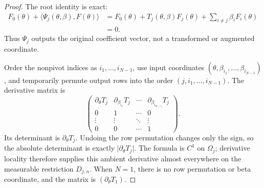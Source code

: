 \begin{proof}
The root identity is exact:
\begin{equation}
\label{eq:appendix-display-078}
\begin{aligned}
F_0(\theta)+\langle\Psi_j(\theta,\beta),F(\theta)\rangle
&=F_0(\theta)+T_j(\theta,\beta)F_j(\theta)
+\sum_{i\neq j}\beta_iF_i(\theta)\\
&=0.
\end{aligned}
\end{equation}
Thus \(\Psi_j\) outputs the original coefficient vector, not a transformed or augmented coordinate.

Order the nonpivot indices as \(i_1,\ldots,i_{N-1}\), use input coordinates
\((\theta,\beta_{i_1},\ldots,\beta_{i_{N-1}})\), and temporarily permute output rows into the order
\((j,i_1,\ldots,i_{N-1})\). The derivative matrix is
\begin{equation}
\label{eq:appendix-display-079}
\begin{pmatrix}
\partial_\theta T_j&
\partial_{\beta_{i_1}}T_j&\cdots&
\partial_{\beta_{i_{N-1}}}T_j\\
0&1&\cdots&0\\
\vdots&\vdots&\ddots&\vdots\\
0&0&\cdots&1
\end{pmatrix}.
\end{equation}
Its determinant is \(\partial_\theta T_j\). Undoing the row permutation changes only the sign, so the
absolute determinant is exactly \(\lvert\partial_\theta T_j\rvert\). The formula is \(C^1\) on
\(\Omega_j\); derivative locality therefore supplies this ambient derivative almost everywhere on the
measurable restriction \(D_{j,n}\). When \(N=1\), there is no row permutation or beta coordinate, and the
matrix is \((\partial_\theta T_1)\). 
\end{proof}

